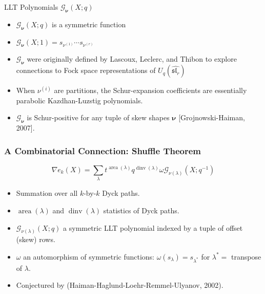 \documentclass[dvipsnames]{beamer}
\newcommand{\Gcal}{{\mathcal G}}
\newcommand{\nubold}{{\boldsymbol \nu }}
\DeclareMathOperator{\dinv}{dinv}
\DeclareMathOperator{\area}{area}
\renewcommand{\sl}{\mathfrak{sl}}
\theoremstyle{definition}
\newcounter{c}
\begin{document}
\begin{frame}{LLT Polynomials \(\Gcal_\nubold(X;q)\)}
  \begin{itemize}
  \item \(\Gcal_\nubold(X;q)\) is a symmetric function\pause
  \item \(\Gcal_\nubold(X;1) = s_{\nu^{(1)}} \cdots s_{\nu^{(r)}}\)\pause
  \item \(\Gcal_\nubold\) were originally defined by Lascoux, Leclerc, and
    Thibon to explore connections to Fock space representations of \(U_q(\hat{\sl_r})\)\pause
  \item When \(\nu^{(i)}\) are partitions, the Schur-expansion
    coefficients are essentially parabolic Kazdhan-Luzstig polynomials.\pause
  \item \(\Gcal_\nubold\) is Schur-positive for any tuple of skew shapes \(\nubold\)
    [Grojnowski-Haiman, 2007].
  \end{itemize}
\end{frame}
\begin{frame}
  \frametitle{A Combinatorial Connection: Shuffle Theorem}
  \begin{theorem}
    \[
      \nabla e_k(X) = \sum_\lambda t^{\area(\lambda)}q^{\dinv(\lambda)}
      \omega \Gcal_{\nu(\lambda)}(X;q^{-1})
    \]
  \end{theorem}
  \begin{itemize}
  \item Summation over all \(k\)-by-\(k\) Dyck paths.\pause
  \item \(\area(\lambda)\) and \(\dinv(\lambda)\) statistics of Dyck paths.\pause
  \item \(\Gcal_{\nu(\lambda)}(X;q)\) a symmetric LLT polynomial
    indexed by a tuple of offset (skew) rows. \pause
  \item \(\omega\) an automorphism of symmetric functions:
    \(\omega(s_\lambda) = s_{\lambda^*}\) for \(\lambda^* =\) transpose of \(\lambda\).\pause
  \item Conjectured by (Haiman-Haglund-Loehr-Remmel-Ulyanov, 2002).
  \end{itemize}
\end{frame}
\end{document}
